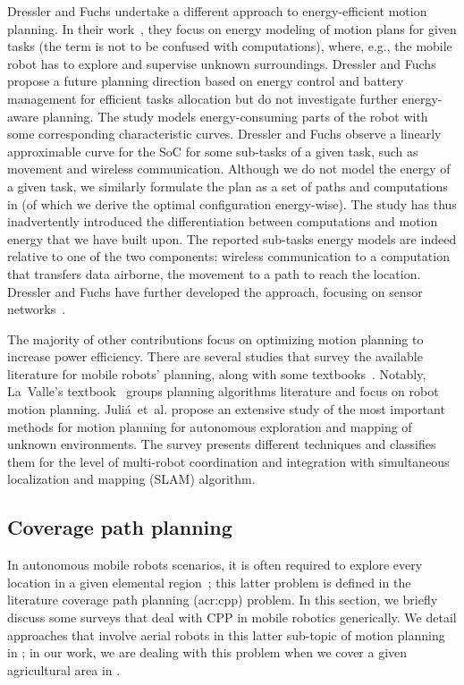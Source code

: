 Dressler and Fuchs undertake a different approach to energy-efficient motion planning. In their work~\citep{dressler2005energy}, they focus on energy modeling of motion plans for given tasks (the term is not to be confused with computations), where, e.g., the mobile robot has to explore and supervise unknown surroundings. Dressler and Fuchs propose a future planning direction based on energy control and battery management for efficient tasks allocation but do not investigate further energy-aware planning. The study models energy-consuming parts of the robot with some corresponding characteristic curves. Dressler and Fuchs observe a linearly approximable curve for the SoC for some sub-tasks of a given task, such as movement and wireless communication. Although we do not model the energy of a given task, we similarly formulate the plan as a set of paths and computations in  (of which we derive the optimal configuration energy-wise). The study has thus inadvertently introduced the differentiation between computations and motion energy that we have built upon. The reported sub-tasks energy models are indeed relative to one of the two components: wireless communication to a computation that
transfers data airborne, the movement to a path to reach the location. Dressler and Fuchs have further developed the approach, focusing on sensor networks~\citep{fuchs2006distributed,dressler2006lifetime}.

The majority of other contributions focus on optimizing motion planning to increase power efficiency. There are several studies that survey the available literature for mobile robots' planning, along with some textbooks~\citep{choset2005principles,lavalle2006planning}. Notably, La~Valle's textbook~\citep{lavalle2006planning} groups planning algorithms literature and focus on robot motion planning. Juli\'{a}~et~al. propose an extensive study of the most important methods for motion planning for autonomous exploration and mapping of unknown environments. The survey presents different techniques and classifies them for the level of multi-robot coordination and integration with simultaneous localization and mapping (SLAM) algorithm. 

\subsection{Coverage path planning}
\label{sec:soa-cov-path-plan}

In autonomous mobile robots scenarios, it is often required to explore every location in a given elemental region~\citep{cao1988region}; this latter problem is defined in the literature coverage path planning (\Gls{acr:cpp}) problem. In this section, we briefly discuss some surveys that deal with CPP in mobile robotics generically. We detail approaches that involve aerial robots in this latter sub-topic of motion planning in ; in our work, we are dealing with this problem when we cover a given agricultural area in .

